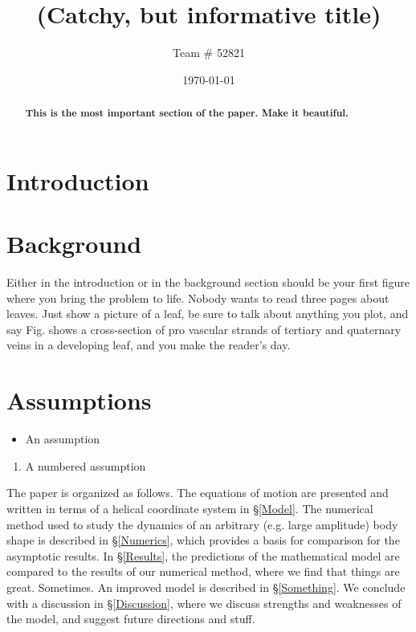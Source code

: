 \documentclass[pre,12pt]{revtex4-1}
\begin{document}
\title{(\textbf{Catchy, but informative title})}
\author{Team \# 52821}
\date{\today}

\begin{abstract}

\textbf{This is the most important section of the paper. Make it beautiful.} \\



\end{abstract}
\maketitle

\newpage

\section{Introduction}\label{Introduction}

\section{Background}\label{Background}

Either in the introduction or in the background section should be your first figure where you bring the problem to life. Nobody wants to read three pages about leaves. Just show a picture of a leaf, be sure to talk about anything you plot, and say Fig. shows a cross-section of pro vascular strands of tertiary and quaternary veins in a developing leaf, and you make the reader's day. 


\section{Assumptions}\label{Assumptions}

\begin{itemize}
\item An assumption
\end{itemize}

\begin{enumerate}
\item A numbered assumption
\end{enumerate}

The paper is organized as follows. The equations of motion are presented and written in terms of a helical coordinate system in \S\ref{Model}. The numerical method used to study the dynamics of an arbitrary (e.g. large amplitude) body shape is described in \S\ref{Numerics}, which provides a basis for comparison for the asymptotic results. In \S\ref{Results}, the predictions of the mathematical model are compared to the results of our numerical method, where we find that things are great. Sometimes. An improved model is described in \S\ref{Something}. We conclude with a discussion in \S\ref{Discussion}, where we discuss strengths and weaknesses of the model, and suggest future directions and stuff.
\end{document}
